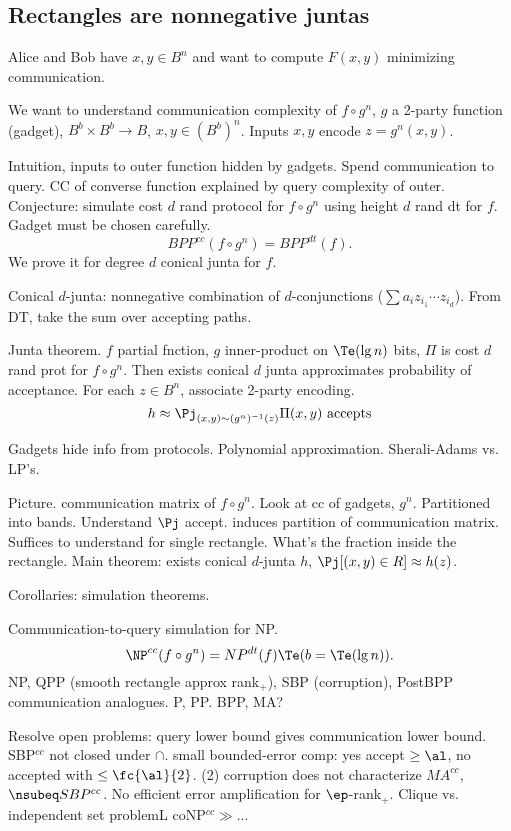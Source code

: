 \subsection{Rectangles are nonnegative juntas}

Alice and Bob have $x,y\in B^n$ and want to compute $F(x,y)$ minimizing communication.

We want to understand communication complexity  of $f\circ g^n$, $g$ a 2-party function (gadget), $B^b\times B^b\to B$, $x,y\in (B^b)^n$.  Inputs $x,y$ encode $z=g^n(x,y)$. %

Intuition, inputs to outer function hidden by gadgets. Spend communication to query. CC of converse function explained by query complexity of outer. 
Conjecture: simulate cost $d$ rand protocol for $f\circ g^n$ using height $d$ rand dt for $f$. Gadget must be chosen carefully.
\[
BPP^{cc}(f\circ g^n)=BPP^{dt}(f).
\]
We prove it for degree $d$ conical junta for $f$.

\begin{df}
Conical $d$-junta: nonnegative combination of $d$-conjunctions ($\sum a_iz_{i_1}\cdots z_{i_d}$). From DT, take the sum over accepting paths.
\end{df}


Junta theorem. $f$ partial fnction, $g$ inner-product on $\Te(\lg n)$ bits, $\Pi$ is cost $d$ rand prot for $f\circ g^n$. Then exists conical $d$ junta approximates probability of acceptance.
For each $z\in B^n$, associate 2-party encoding. 
\[
h\approx \Pj_{(x,y)\sim (g^n)^{-1}(z)}\Pi(x,y)\text{ accepts}
\]

Gadgets hide info from protocols.
Polynomial approximation. Sherali-Adams vs. LP's.

Picture. communication matrix of $f\circ g^n$. Look at cc of gadgets, $g^n$. Partitioned into bands. Understand $\Pj$ accept. induces partition of communication matrix. Suffices to understand for single rectangle. What's the fraction inside the rectangle. Main theorem: exists conical $d$-junta $h$, $\Pj[(x,y)\in R]\approx h(z)$.

Corollaries: simulation theorems.

Communication-to-query simulation for NP.
\[
\NP^{cc}(f\circ g^n)=NP^{dt}(f)\Te(b=\Te(\lg n)).
\]
NP, QPP (smooth rectangle approx rank${}_+$), SBP (corruption), PostBPP communication analogues.
P, PP. BPP, MA?

Resolve open problems: query lower bound gives communication lower bound. SBP${}^{cc}$ not closed under $\cap$. small bounded-error comp: yes accept $\ge \al$, no accepted with $\le \fc{\al}{2}$. (2) corruption does not characterize $MA^{cc}$, $\nsubeq SBP^{cc}$. %
No efficient error amplification for $\ep$-rank${}_+$. Clique vs. independent set problemL coNP${}^{cc}\gg$...

